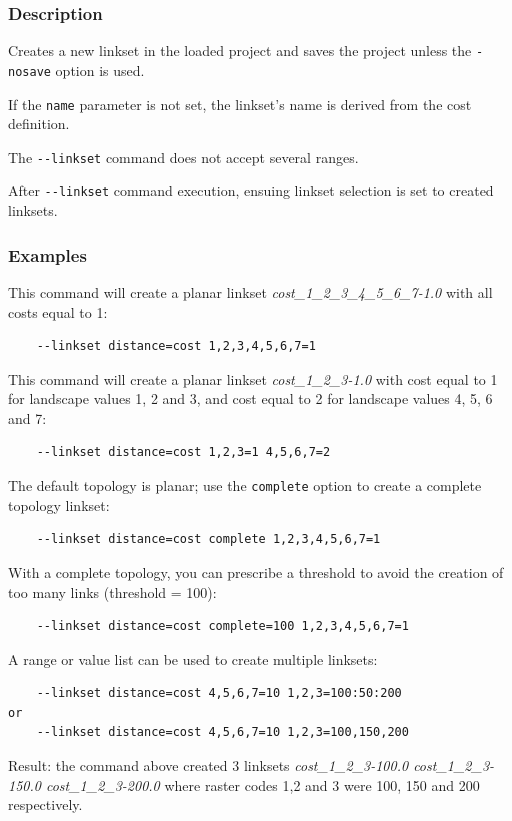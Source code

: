 \documentclass[a4paper,10pt]{report}
\begin{document}
\subsubsection{Description}
Creates a new linkset in the loaded project and saves the project unless the \verb|-nosave| option is used. 

If the \verb|name| parameter is not set, the linkset's name is derived from the cost definition.

The \verb|--linkset| command does not accept several ranges.

After \verb|--linkset| command execution, ensuing linkset selection is set to created linksets.

\subsubsection{Examples}
This command will create a planar linkset \textit{cost\_1\_2\_3\_4\_5\_6\_7-1.0} with all costs equal to 1:
\begin{Verbatim}
	--linkset distance=cost 1,2,3,4,5,6,7=1
\end{Verbatim}

This command will create a planar linkset \textit{cost\_1\_2\_3-1.0} with cost equal to 1 for landscape values 1, 2 and 3, and cost equal to 2 for landscape values 4, 5, 6 and 7:
\begin{Verbatim}
	--linkset distance=cost 1,2,3=1 4,5,6,7=2
\end{Verbatim}

The default topology is planar; use the \verb|complete| option to create a complete topology linkset:
\begin{Verbatim}
	--linkset distance=cost complete 1,2,3,4,5,6,7=1
\end{Verbatim}

With a complete topology, you can prescribe a threshold to avoid the creation of too many links (threshold = 100):
\begin{Verbatim}
	--linkset distance=cost complete=100 1,2,3,4,5,6,7=1
\end{Verbatim}

A range or value list can be used to create multiple linksets:
\begin{Verbatim}
	--linkset distance=cost 4,5,6,7=10 1,2,3=100:50:200
or
	--linkset distance=cost 4,5,6,7=10 1,2,3=100,150,200
\end{Verbatim}
Result: the command above created 3 linksets \textit{cost\_1\_2\_3-100.0 cost\_1\_2\_3-150.0 cost\_1\_2\_3-200.0}
where raster codes 1,2 and 3 were 100, 150 and 200 respectively.
\end{document}
